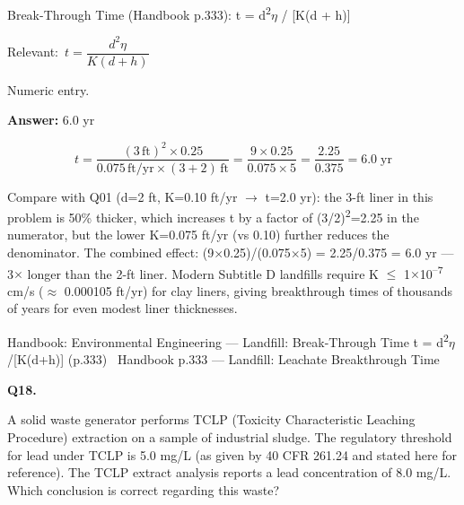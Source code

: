 \documentclass[11pt]{article}
\begin{document}
Break-Through Time (Handbook p.333):
t = d\textsuperscript{2}$\eta$ / [K(d + h)]\par\vspace{3pt}
{\small\color{soft}Relevant:}\ $t = \dfrac{d^2 \eta}{K(d + h)}$\par\vspace{3pt}
{\small\color{soft}Numeric entry.}\par\vspace{3pt}
\vspace{2pt}\par\noindent\colorbox{boxbg}{\parbox{\dimexpr\linewidth-2\fboxsep\relax}{%
\vspace{2pt}\textbf{Answer:} 6.0 yr\par\vspace{2pt}
{\small \[t = \frac{(3\,\text{ft})^2 \times 0.25}{0.075\,\text{ft/yr} \times (3+2)\,\text{ft}} = \frac{9 \times 0.25}{0.075 \times 5} = \frac{2.25}{0.375} = 6.0\;\text{yr}\]

Compare with Q01 (d=2 ft, K=0.10 ft/yr $\rightarrow$ t=2.0 yr): the 3-ft liner in this problem is 50\% thicker, which increases t by a factor of (3/2)\textsuperscript{2}=2.25 in the numerator, but the lower K=0.075 ft/yr (vs 0.10) further reduces the denominator. The combined effect: (9$\times$0.25)/(0.075$\times$5) = 2.25/0.375 = 6.0 yr --- 3$\times$ longer than the 2-ft liner. Modern Subtitle D landfills require K $\le$ 1$\times$10\textsuperscript{--}\textsuperscript{7} cm/s ($\approx$ 0.000105 ft/yr) for clay liners, giving breakthrough times of thousands of years for even modest liner thicknesses.}\par\vspace{2pt}
{\footnotesize\color{soft}Handbook: Environmental Engineering --- Landfill: Break-Through Time t = d\textsuperscript{2}$\eta$/[K(d+h)] (p.333) \textbullet\ Handbook p.333 --- Landfill: Leachate Breakthrough Time}\vspace{2pt}
}}
\vspace{9pt}
\filbreak
\textbf{\color{accent}Q18.}\par\vspace{2pt}
A solid waste generator performs TCLP (Toxicity Characteristic Leaching Procedure) extraction on a sample of industrial sludge. The regulatory threshold for lead under TCLP is 5.0 mg/L (as given by 40 CFR 261.24 and stated here for reference). The TCLP extract analysis reports a lead concentration of 8.0 mg/L. Which conclusion is correct regarding this waste?\par\vspace{3pt}
\end{document}
